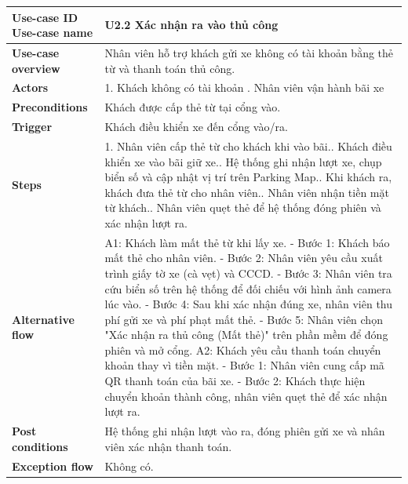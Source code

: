 \begin{tabularx}{\textwidth}{|>{\raggedright\arraybackslash}p{4cm}|X|}
\hline
\textbf{Use-case ID} \newline \textbf{Use-case name} & U2.2 \newline \textbf{Xác nhận ra vào thủ công} \\ \hline
\textbf{Use-case overview} & Nhân viên hỗ trợ khách gửi xe không có tài khoản bằng thẻ từ và thanh toán thủ công. \\ \hline
\textbf{Actors} & 1. Khách không có tài khoản \newline 2. Nhân viên vận hành bãi xe \\ \hline
\textbf{Preconditions} & Khách được cấp thẻ từ tại cổng vào. \\ \hline
\textbf{Trigger} & Khách điều khiển xe đến cổng vào/ra. \\ \hline

\textbf{Steps} &
1. Nhân viên cấp thẻ từ cho khách khi vào bãi.\newline
2. Khách điều khiển xe vào bãi giữ xe.\newline
3. Hệ thống ghi nhận lượt xe, chụp biển số và cập nhật vị trí trên Parking Map.\newline
4. Khi khách ra, khách đưa thẻ từ cho nhân viên.\newline
5. Nhân viên nhận tiền mặt từ khách.\newline
6. Nhân viên quẹt thẻ để hệ thống đóng phiên và xác nhận lượt ra. \\ \hline

\textbf{Alternative flow} & 
A1: Khách làm mất thẻ từ khi lấy xe.\newline
- Bước 1: Khách báo mất thẻ cho nhân viên.\newline
- Bước 2: Nhân viên yêu cầu xuất trình giấy tờ xe (cà vẹt) và CCCD.\newline
- Bước 3: Nhân viên tra cứu biển số trên hệ thống để đối chiếu với hình ảnh camera lúc vào.\newline
- Bước 4: Sau khi xác nhận đúng xe, nhân viên thu phí gửi xe và phí phạt mất thẻ.\newline
- Bước 5: Nhân viên chọn "Xác nhận ra thủ công (Mất thẻ)" trên phần mềm để đóng phiên và mở cổng.\newline
\newline
A2: Khách yêu cầu thanh toán chuyển khoản thay vì tiền mặt.\newline
- Bước 1: Nhân viên cung cấp mã QR thanh toán của bãi xe.\newline
- Bước 2: Khách thực hiện chuyển khoản thành công, nhân viên quẹt thẻ để xác nhận lượt ra. \\ \hline

\textbf{Post conditions} & Hệ thống ghi nhận lượt vào ra, đóng phiên gửi xe và nhân viên xác nhận thanh toán. \\ \hline

\textbf{Exception flow} & Không có. \\ \hline
\end{tabularx}


